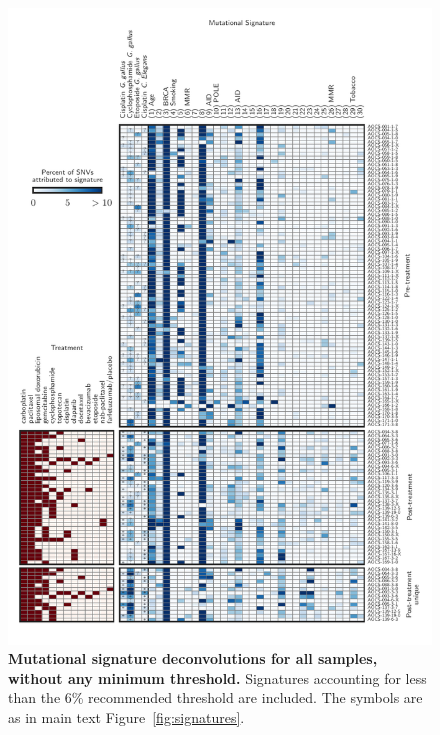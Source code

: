 \begin{figure}
\centering
\includegraphics[scale=1.0]{figures/supplementary_signatures_no_cutoff.pdf}
\caption{\textbf{Mutational signature deconvolutions for all samples, without any minimum threshold.} Signatures accounting for less than the 6\% recommended threshold are included. The symbols are as in main text Figure~\ref{fig:signatures}.}
\label{fig:supplementary_signatures_no_cutoff.pdf}
\end{figure}

\FloatBarrier
